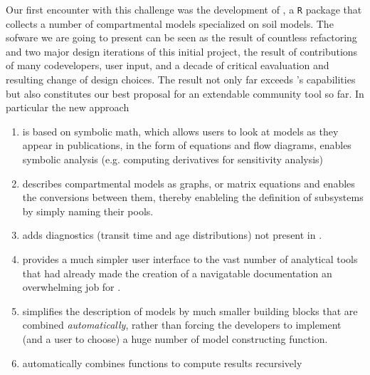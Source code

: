 Our first encounter with this challenge was the development of \SoilR \citep{SoilR}, a \texttt{R} package that collects a number of compartmental models specialized on soil models.
The sofware we are going to present can be seen as the result of countless refactoring and two major design iterations of this
initial project, the result of contributions of many codevelopers, user input,  
and a decade of critical eavaluation and resulting change of design choices.
The result not only far exceeds \SoilR's 
capabilities but also constitutes our best proposal for an extendable community tool so far.
In particular the new approach
\begin{enumerate}
  \item
    is based on symbolic math, which allows users to look at models
    as they appear in publications, in the form of equations and flow diagrams,
    enables symbolic analysis (e.g. computing derivatives for sensitivity analysis)
  \item 
    describes compartmental models as graphs, or matrix equations and enables the conversions between them, thereby enableling the definition of subsystems by simply naming their pools.
  \item
    adds diagnostics (transit time and age distributions) not present in \SoilR.
  \item
    provides a much simpler user interface 
    to the vast number of analytical tools that had already made the creation of a navigatable documentation an overwhelming job for \SoilR. 

  \item
    simplifies the description of models by much smaller building blocks that are combined
    \emph{automatically}, rather than forcing the developers to implement (and a user to choose) a
    huge number of model constructing function. 
  \item 
    automatically combines functions to compute results recursively
\end{enumerate}

